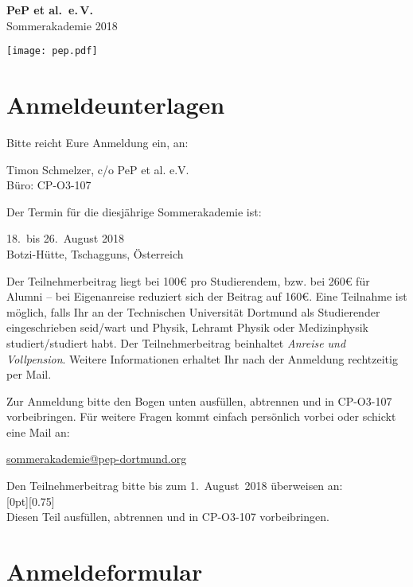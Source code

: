 \documentclass[
  paper=a4,
  fontsize=12pt,
  parskip=half,
]{scrartcl}
\newcommand{\cuthere}{%
  \noindent%
  \raisebox{-0.7ex}[0pt][0.75\baselineskip]{\geomfont\symbol{"2702}}%
  \unskip{\tiny\dotfill}\\
}
\begin{document}
\begin{minipage}{0.5\textwidth}
  \large\textbf{PeP et al.\ e.\,V.}\\%
  Sommerakademie 2018
\end{minipage}%
\begin{minipage}{0.5\textwidth}
  \raggedleft%
  \texttt{[image: pep.pdf]}
\end{minipage}


\section*{Anmeldeunterlagen}
Bitte reicht Eure Anmeldung ein, an:
\begin{addmargin}[1em]{2em}
  Timon Schmelzer, c/o PeP et al. e.V. \\
  Büro: CP-O3-107
\end{addmargin}

Der Termin für die diesjährige Sommerakademie ist:
\begin{addmargin}[1em]{2em}
  18.\ bis 26.\ August 2018 \\
  Botzi-Hütte, Tschagguns, Österreich
\end{addmargin}

Der Teilnehmerbeitrag liegt bei 100€ pro Studierendem, bzw. bei 260€ für Alumni -- bei Eigenanreise reduziert sich der Beitrag auf 160€.
Eine Teilnahme ist möglich, falls Ihr an der Technischen Universität Dortmund als Studierender eingeschrieben seid/wart und Physik, Lehramt Physik oder Medizinphysik studiert/studiert habt.
Der Teilnehmerbeitrag beinhaltet \emph{Anreise und Vollpension}.
Weitere Informationen erhaltet Ihr nach der Anmeldung rechtzeitig per Mail.

Zur Anmeldung bitte den Bogen unten ausfüllen, abtrennen und in CP-O3-107 vorbeibringen.
Für weitere Fragen kommt einfach persönlich vorbei oder schickt eine Mail an:\\
\centerline{\href{mailto:sommerakademie@pep-dortmund.org}{sommerakademie@pep-dortmund.org}}

Den Teilnehmerbeitrag bitte bis zum 1.~August~2018 überweisen an: \\
%

\cuthere
{\scriptsize Diesen Teil ausfüllen, abtrennen und in CP-O3-107 vorbeibringen.}

\section*{Anmeldeformular}
\end{document}

